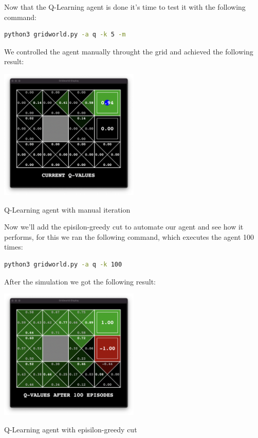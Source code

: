 \documentclass{article}
\begin{document}
Now that the Q-Learning agent is done it's time to test it with the following command:

\begin{lstlisting}[language=bash, frame=tlbr, framesep=6pt, backgroundcolor=\color{light-gray}]
  python3 gridworld.py -a q -k 5 -m
\end{lstlisting}

We controlled the agent manually throught the grid and achieved the following result:

\begin{table}[ht!]
  \begin{center}
    \includegraphics[width=0.5\textwidth]{images/qLearning-ex2.png}
  \end{center}
\caption{Q-Learning agent with manual iteration}
\end{table}

Now we'll add the episilon-greedy cut to automate our agent and see how it performs, for this we ran the following command, which executes the agent 100 times:

\hbox{}
\begin{lstlisting}[language=bash, frame=tlbr, framesep=6pt, backgroundcolor=\color{light-gray}]
  python3 gridworld.py -a q -k 100
\end{lstlisting}
\hbox{}
After the simulation we got the following result:
\begin{table}[ht!]
  \begin{center}
    \includegraphics[width=0.5\textwidth]{images/qLearning-ex4.png}
  \end{center}
\caption{Q-Learning agent with episilon-greedy cut}
\end{table}
\end{document}
